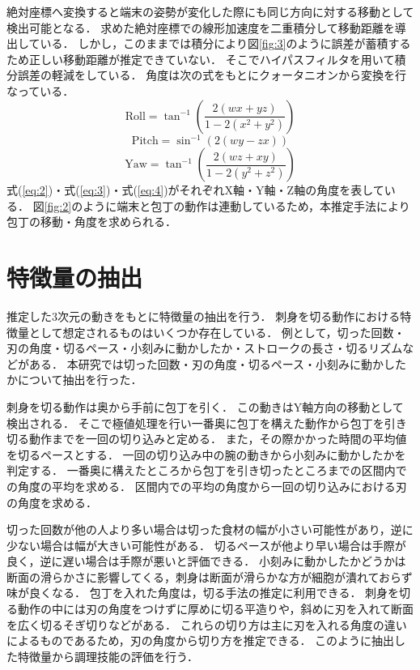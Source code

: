 絶対座標へ変換すると端末の姿勢が変化した際にも同じ方向に対する移動として検出可能となる．
求めた絶対座標での線形加速度を二重積分して移動距離を導出している．
しかし，このままでは積分により図\ref{fig:3}のように誤差が蓄積するため正しい移動距離が推定できていない．
そこでハイパスフィルタを用いて積分誤差の軽減をしている．
角度は次の式をもとにクォータニオンから変換を行なっている．
\begin{equation}
	\text{Roll} = \tan^{-1}\left( \frac{2(w x + y z)}{1 - 2(x^2 + y^2)} \right)
	\label{eq:2}
\end{equation}
\begin{equation}
	\text{Pitch} = \sin^{-1}\left( 2(w y - z x) \right)
	\label{eq:3}
\end{equation}
\begin{equation}
	\text{Yaw} = \tan^{-1}\left( \frac{2(w z + x y)}{1 - 2(y^2 + z^2)} \right)
	\label{eq:4}
\end{equation}
式(\ref{eq:2})・式(\ref{eq:3})・式(\ref{eq:4})がそれぞれX軸・Y軸・Z軸の角度を表している．
図\ref{fig:2}のように端末と包丁の動作は連動しているため，本推定手法により包丁の移動・角度を求められる．

\section{特徴量の抽出}
推定した3次元の動きをもとに特徴量の抽出を行う．
刺身を切る動作における特徴量として想定されるものはいくつか存在している．
例として，切った回数・刃の角度・切るペース・小刻みに動かしたか・ストロークの長さ・切るリズムなどがある．
本研究では切った回数・刃の角度・切るペース・小刻みに動かしたかについて抽出を行った．

刺身を切る動作は奥から手前に包丁を引く．
この動きはY軸方向の移動として検出される．
そこで極値処理を行い一番奥に包丁を構えた動作から包丁を引き切る動作までを一回の切り込みと定める．
また，その際かかった時間の平均値を切るペースとする．
一回の切り込み中の腕の動きから小刻みに動かしたかを判定する．
一番奥に構えたところから包丁を引き切ったところまでの区間内での角度の平均を求める．
区間内での平均の角度から一回の切り込みにおける刃の角度を求める．

切った回数が他の人より多い場合は切った食材の幅が小さい可能性があり，逆に少ない場合は幅が大きい可能性がある．
切るペースが他より早い場合は手際が良く，逆に遅い場合は手際が悪いと評価できる．
小刻みに動かしたかどうかは断面の滑らかさに影響してくる，刺身は断面が滑らかな方が細胞が潰れておらず味が良くなる．
包丁を入れた角度は，切る手法の推定に利用できる．
刺身を切る動作の中には刃の角度をつけずに厚めに切る平造りや，斜めに刃を入れて断面を広く切るそぎ切りなどがある．
これらの切り方は主に刃を入れる角度の違いによるものであるため，刃の角度から切り方を推定できる．
このように抽出した特徴量から調理技能の評価を行う．